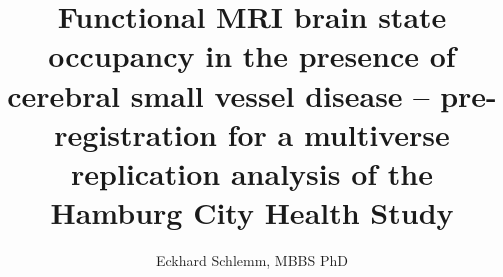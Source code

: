 \documentclass[12pt,biorxiv,lineno,doublespacing]{lapreprint}
\title{Functional MRI brain state occupancy in the presence of cerebral small vessel disease -- pre-registration for a multiverse replication analysis of the Hamburg City Health Study}
\author[ \orcidlink{0000-0002-5729-2935} 1 \Letter]{Eckhard Schlemm, MBBS PhD}
\affil[1]{Department of Neurology, University Medical Center Hamburg-Eppendorf}
\begin{document}
\maketitle






\printbibliography

\if@endfloat\clearpage\processdelayedfloats\clearpage\fi 



%     

%     



\end{document}
